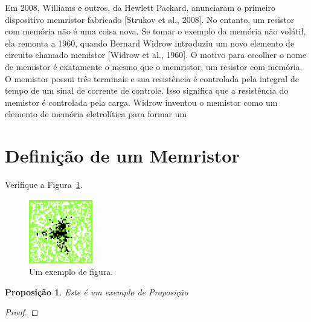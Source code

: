 \documentclass[10pt,twoside,a4paper]{article}
\newtheorem{theorem}{Teorema}
\newtheorem{proposition}[theorem]{Proposição}
\begin{document}
Em 2008, Williams e outros, da Hewlett Packard, anunciaram o primeiro dispositivo memristor fabricado [Strukov et al., 2008]. No entanto, um resistor com memória não é uma coisa nova. Se tomar o exemplo da memória não volátil, ela remonta a 1960, quando Bernard Widrow introduziu um novo elemento de circuito chamado memistor [Widrow et al., 1960]. O motivo para escolher o nome de memistor é exatamente o mesmo que o memristor, um resistor com memória. O memistor possui três terminais e sua resistência é controlada pela integral de tempo de um sinal de corrente de controle. Isso significa que a resistência do memistor é controlada pela carga. Widrow inventou o memistor como um elemento de memória eletrolítica para formar um

\section{Definição de um Memristor} %
\lipsum[5]

Verifique a Figura~\ref{fig:distribuicao}.


\begin{figure}[!ht]
\centering
\includegraphics[scale=1.4]{cnmac2}
\caption{Um exemplo de figura.}
\label{fig:distribuicao}
\end{figure}

\lipsum[4]

\begin{proposition}
Este é um exemplo de Proposição
\end{proposition}
\begin{proof}
\lipsum[2]
\end{proof}

\lipsum[3-4]
\end{document}
